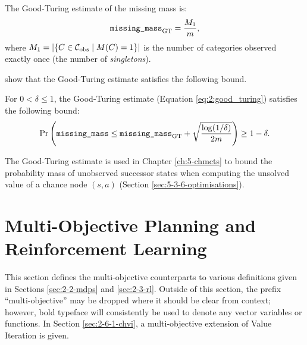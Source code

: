     The Good-Turing estimate of the missing mass is:
    \begin{align}
        {\textnormal{\texttt{missing\_mass}}_{\textnormal{GT}}} = \frac{M_1}{m}, \label{eq:2:good_turing}
    \end{align}
    where $M_1 = |\{C\in\mathcal{C}_{\textnormal{obs}} \mid M(C)=1\}|$ is the number of categories observed exactly once (the number of \textit{singletons}).

    \citet{good_turing_converge} show that the Good-Turing estimate satisfies the following bound.
    \begin{theorem}
        \label{thrm:2:good_turing_bound}
        For $0<\delta\leq 1$, the Good-Turing estimate (Equation \ref{eq:2:good_turing}) satisfies the following bound: 
        \begin{align}
            \Pr\left({\textnormal{\texttt{missing\_mass}}} \leq {\textnormal{\texttt{missing\_mass}}_{\textnormal{GT}}} + \sqrt{\frac{\log(1/\delta)}{2m}}\right) \geq 1-\delta.
            \label{eq:2:good_turing_bound}
        \end{align}
    \end{theorem}

    The Good-Turing estimate is used in Chapter \ref{ch:5-chmcts} to bound the probability mass of unobserved successor states when computing the unsolved value of a chance node $(s,a)$ (Section \ref{sec:5-3-6-optimisations}).















\section{Multi-Objective Planning and Reinforcement Learning}
\label{sec:2-6-morl}

This section defines the multi-objective counterparts to various definitions given in Sections \ref{sec:2-2-mdps} and \ref{sec:2-3-rl}. Outside of this section, the prefix ``multi-objective'' may be dropped where it should be clear from context; however, bold typeface will consistently be used to denote any vector variables or functions. In Section \ref{sec:2-6-1-chvi}, a multi-objective extension of Value Iteration is given.

